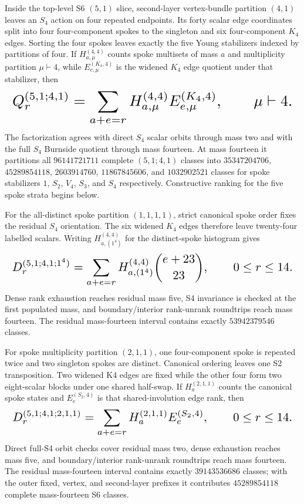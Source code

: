 \documentclass{article}
\newcommand{\fitmath}[1]{\resizebox{0.99\linewidth}{!}{$\displaystyle #1$}}
\begin{document}
Inside the top-level S6 $(5,1)$ slice, second-layer vertex-bundle partition
$(4,1)$ leaves an $S_4$ action on four repeated endpoints. Its forty scalar
edge coordinates split into four four-component spokes to the singleton and six
four-component $K_4$ edges. Sorting the four spokes leaves exactly the five
Young stabilizers indexed by partitions of four. If $H_{a,\mu}^{(4,4)}$ counts
spoke multisets of mass $a$ and multiplicity partition $\mu\vdash4$, while
$E_{e,\mu}^{(K_4,4)}$ is the widened $K_4$ edge quotient under that stabilizer,
then
\begin{equation}
  \fitmath{%
    Q_r^{(5,1;4,1)}=
      \sum_{a+e=r}H_{a,\mu}^{(4,4)}E_{e,\mu}^{(K_4,4)},
    \qquad \mu\vdash4.
  }
  \label{eq:optimization-crazy-sextuple-s6-s5-s4-spoke-decomposition}
\end{equation}
The factorization agrees with direct $S_4$ scalar orbits through mass two and
with the full $S_4$ Burnside quotient through mass fourteen. At mass fourteen
it partitions all $96141721711$ complete $(5,1;4,1)$ classes into
$35347204706$, $45289854118$, $2603914760$, $11867845606$, and $1032902521$
classes for spoke stabilizers $1$, $S_2$, $V_4$, $S_3$, and $S_4$ respectively.
Constructive ranking for the five spoke strata begins below.

For the all-distinct spoke partition $(1,1,1,1)$, strict canonical spoke order
fixes the residual $S_4$ orientation. The six widened $K_4$ edges therefore
leave twenty-four labelled scalars. Writing $H_{a,(1^4)}^{(4,4)}$ for the
distinct-spoke histogram gives
\begin{equation}
  \fitmath{%
    D_r^{(5,1;4,1;1^4)}=
      \sum_{a+e=r}H_{a,(1^4)}^{(4,4)}{e+23\choose23},
    \qquad 0\leq r\leq14.
  }
  \label{eq:optimization-crazy-sextuple-s6-s5-s4-distinct-spoke-ranking}
\end{equation}
Dense rank exhaustion reaches residual mass five, S4 invariance is checked at
the first populated mass, and boundary/interior rank-unrank roundtrips reach
mass fourteen. The residual mass-fourteen interval contains exactly
$53942379546$ classes.

For spoke multiplicity partition $(2,1,1)$, one four-component spoke is repeated
twice and two singleton spokes are distinct. Canonical ordering leaves one S2
transposition. Two widened K4 edges are fixed while the other four form two
eight-scalar blocks under one shared half-swap. If $H_a^{(2,1,1)}$ counts the
canonical spoke states and $E_e^{(S_2,4)}$ is that shared-involution edge rank,
then
\begin{equation}
  \fitmath{%
    D_r^{(5,1;4,1;2,1,1)}=
      \sum_{a+e=r}H_a^{(2,1,1)}E_e^{(S_2,4)},
    \qquad 0\leq r\leq14.
  }
  \label{eq:optimization-crazy-sextuple-s6-s5-s4-s2-spoke-ranking}
\end{equation}
Direct full-S4 orbit checks cover residual mass two, dense exhaustion reaches
mass five, and boundary/interior rank-unrank roundtrips reach mass fourteen.
The residual mass-fourteen interval contains exactly $39143536686$ classes;
with the outer fixed, vertex, and second-layer prefixes it contributes
$45289854118$ complete mass-fourteen S6 classes.
\end{document}
